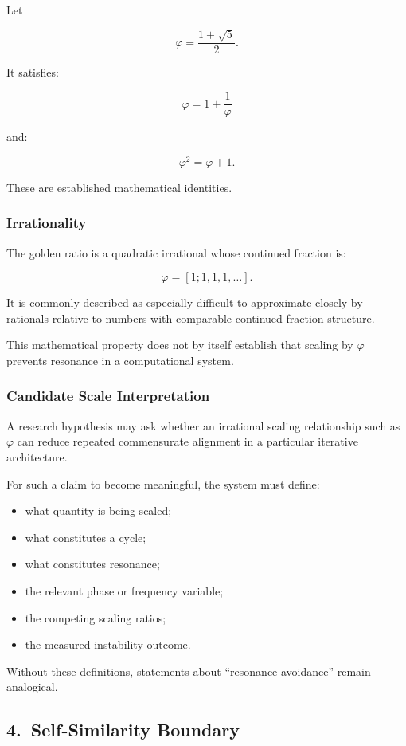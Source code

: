 Let

\[
\varphi = \frac{1+\sqrt{5}}{2}.
\]

It satisfies:

\[
\varphi = 1 + \frac{1}{\varphi}
\]

and:

\[
\varphi^2 = \varphi + 1.
\]

These are established mathematical identities.

\subsubsection*{Irrationality}

The golden ratio is a quadratic irrational whose continued fraction is:

\[
\varphi = [1;1,1,1,\ldots].
\]

It is commonly described as especially difficult to approximate closely by
rationals relative to numbers with comparable continued-fraction structure.

This mathematical property does not by itself establish that scaling by
$\varphi$ prevents resonance in a computational system.

\subsubsection*{Candidate Scale Interpretation}

A research hypothesis may ask whether an irrational scaling relationship such
as $\varphi$ can reduce repeated commensurate alignment in a particular
iterative architecture.

For such a claim to become meaningful, the system must define:

\begin{itemize}
    \item what quantity is being scaled;
    \item what constitutes a cycle;
    \item what constitutes resonance;
    \item the relevant phase or frequency variable;
    \item the competing scaling ratios;
    \item the measured instability outcome.
\end{itemize}

Without these definitions, statements about ``resonance avoidance'' remain
analogical.

\subsection*{4.\ Self-Similarity Boundary}

